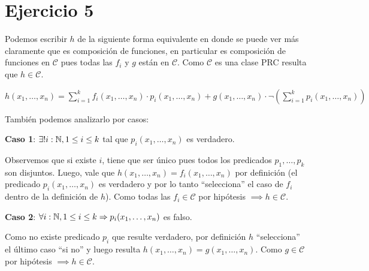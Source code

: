 \section*{Ejercicio 5}

Podemos escribir $h$ de la siguiente forma equivalente en donde se puede ver más claramente que es composición de funciones, en particular es composición de funciones en $\mathcal{C}$ pues todas las $f_i$ y $g$ están en $\mathcal{C}$. Como $\mathcal{C}$ es una clase PRC resulta que $h \in \mathcal{C}$.

$h(x_1, \dots, x_n) = \sum_{i=1}^k f_i(x_1, \dots, x_n) \cdot p_i(x_1, \dots, x_n) + g(x_1, \dots, x_n) \cdot \neg (\sum_{i=1}^k p_i(x_1, \dots, x_n))$

También podemos analizarlo por casos:

\textbf{Caso 1}: $\exists! i: \mathbb{N}, 1 \leq i \leq k$ tal que $p_i(x_1, \dots, x_n)$ es verdadero.

Observemos que si existe $i$, tiene que ser único pues todos los predicados $p_1, \dots, p_k$ son disjuntos. Luego, vale que $h(x_1, \dots, x_n) = f_i(x_1, \dots, x_n)$ por definición (el predicado $p_i(x_1, \dots, x_n)$ es verdadero y por lo tanto ``selecciona'' el caso de $f_i$ dentro de la definición de $h$). Como todas las $f_i \in \mathcal{C}$ por hipótesis $\implies h \in \mathcal{C}$.

\textbf{Caso 2}: $\forall i: \mathbb{N}, 1 \leq i \leq k \Rightarrow p_i(x_1, \dots, x_n)$ es falso.

Como no existe predicado $p_i$ que resulte verdadero, por definición $h$ ``selecciona'' el último caso ``si no'' y luego resulta $h(x_1, \dots, x_n) = g(x_1, \dots, x_n)$. Como $g \in \mathcal{C}$ por hipótesis $\implies h \in \mathcal{C}$.
